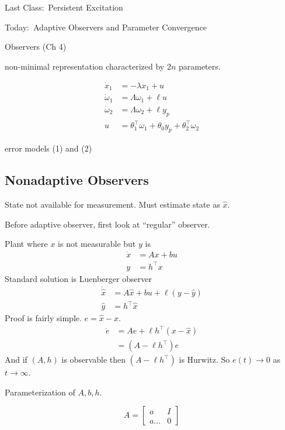 Last Class:\ Persistent Excitation

Today:\ Adaptive Observers and Parameter Convergence

Observers (Ch 4)

non-minimal representation
characterized by $2n$ parameters.

\begin{align*}
  \dot{x}_{1}&=-\lambda x_{1}+u \\
  \dot{\omega}_{1}&=\Lambda\omega_{1}+\ell u \\
  \dot{\omega}_{2}&=\Lambda\omega_{2}+\ell y_{p} \\
  u&=\theta_{1}^{\top}\omega_{1}+\theta_{0}y_{p}+\theta_{2}^{\top}\omega_{2}
\end{align*}

error models (1) and (2)

\subsection{Nonadaptive Observers}

State not available for measurement.
Must estimate state as $\hat{x}$.

Before adaptive observer, first look at ``regular'' observer.

Plant where $x$ is not measurable but $y$ is
\begin{align*}
  \dot{x}&=Ax+bu \\
  y&=h^{\top}x
\end{align*}
Standard solution is Luenberger observer
\begin{align*}
  \dot{\hat{x}}&=A\hat{x}+bu+\ell(y-\hat{y}) \\
  \hat{y}&=h^{\top}\hat{x}
\end{align*}
Proof is fairly simple.
$e=\hat{x}-x$.
\begin{align*}
  \dot{e}&=Ae+\ell h^{\top}(x-\hat{x}) \\
  &=(A-\ell h^{\top})e
\end{align*}
And if $(A,h)$ is observable then $(A-\ell h^{\top})$ is Hurwitz.
So $e(t)\rightarrow0$ as $t\rightarrow\infty$.

Parameterization of $A,b,h$.

\begin{equation*}
  A=
  \begin{bmatrix}
    a & I \\
    a \dots & 0
  \end{bmatrix}
\end{equation*}

